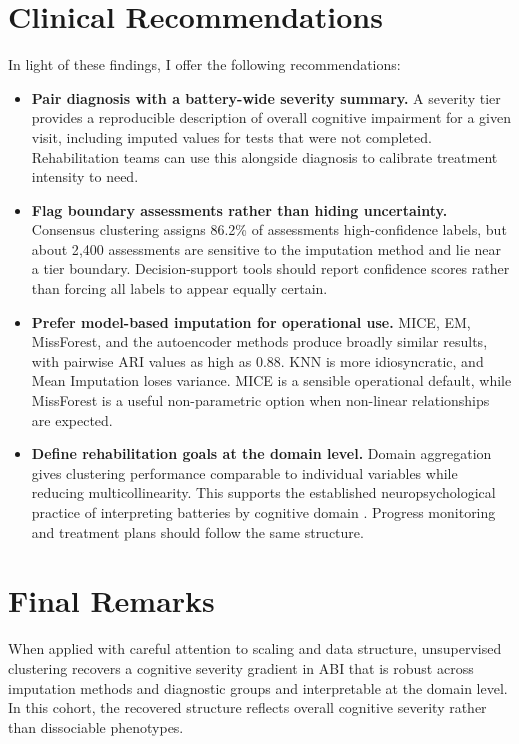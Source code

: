 \section{Clinical Recommendations}

In light of these findings, I offer the following recommendations:
\begin{itemize}
    \item \textbf{Pair diagnosis with a battery-wide severity summary.} A severity tier provides a reproducible description of overall cognitive impairment for a given visit, including imputed values for tests that were not completed. Rehabilitation teams can use this alongside diagnosis to calibrate treatment intensity to need.
    \item \textbf{Flag boundary assessments rather than hiding uncertainty.} Consensus clustering assigns 86.2\% of assessments high-confidence labels, but about 2{,}400 assessments are sensitive to the imputation method and lie near a tier boundary. Decision-support tools should report confidence scores rather than forcing all labels to appear equally certain.
    \item \textbf{Prefer model-based imputation for operational use.} MICE, EM, MissForest, and the autoencoder methods produce broadly similar results, with pairwise ARI values as high as 0.88. KNN is more idiosyncratic, and Mean Imputation loses variance. MICE is a sensible operational default, while MissForest is a useful non-parametric option when non-linear relationships are expected.
    \item \textbf{Define rehabilitation goals at the domain level.} Domain aggregation gives clustering performance comparable to individual variables while reducing multicollinearity. This supports the established neuropsychological practice of interpreting batteries by cognitive domain \parencite{lezak2012neuropsychological}. Progress monitoring and treatment plans should follow the same structure.
\end{itemize}


\section{Final Remarks}

When applied with careful attention to scaling and data structure, unsupervised clustering recovers a cognitive severity gradient in ABI that is robust across imputation methods and diagnostic groups and interpretable at the domain level. In this cohort, the recovered structure reflects overall cognitive severity rather than dissociable phenotypes.

